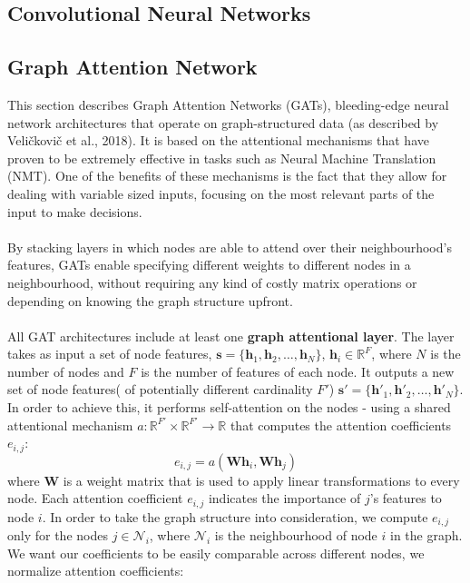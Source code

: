 	\subsection{Convolutional Neural Networks} 
		
	\subsection{Graph Attention Network}	
	This section describes Graph Attention Networks (GATs), bleeding-edge neural network architectures that operate on graph-structured data (as described by Veli\v{c}kovi\v{c} et al., 2018). It is based on the attentional mechanisms that have proven to be extremely effective in tasks such as Neural Machine Translation (NMT). One of the benefits of these mechanisms is the fact that they allow for dealing with variable sized inputs, focusing on the most relevant parts of the input to make decisions. 
	\\ \\ 
	By stacking layers in which nodes are able to attend over their neighbourhood's features, GATs enable specifying different weights to different nodes in a neighbourhood, without requiring any kind of costly matrix operations or depending on knowing the graph structure upfront. 
	\\ \\
	All GAT architectures include at least one \textbf{graph attentional layer}. The layer takes as input a set of node features, $\mathbf{s} = \{\mathbf{h}_1, \mathbf{h}_2, \dots , \mathbf{h}_N \}$, $\mathbf{h}_i \in \mathbb{R}^F$, where $N$ is the number of nodes and $F$ is the number of features of each node. It outputs a new set of node features( of potentially different cardinality $F'$) $\mathbf{s'} = \{ \mathbf{h'}_1, \mathbf{h'}_2, \dots , \mathbf{h'}_N \}$. In order to achieve this, it performs self-attention on the nodes - using a shared attentional mechanism $a:\mathbb{R}^{F'}\times\mathbb{R}^{F'}\rightarrow\mathbb{R}$ that computes the attention coefficients $e_{i,j}$:
	\begin{equation}
		e_{i,j} = a(\mathbf{W}\mathbf{h}_i, \mathbf{W}\mathbf{h}_j)		
	\end{equation} 
	where $\mathbf{W}$ is a weight matrix that is used to apply linear transformations to every node. Each attention coefficient $e_{i,j}$ indicates the importance of $j$'s features to node $i$. In order to take the graph structure into consideration, we compute $e_{i,j}$ only for the nodes $j \in \mathcal{N}_i$, where $\mathcal{N}_i$ is the neighbourhood of node $i$ in the graph. We want our coefficients to be easily comparable across different nodes, we normalize attention coefficients:
